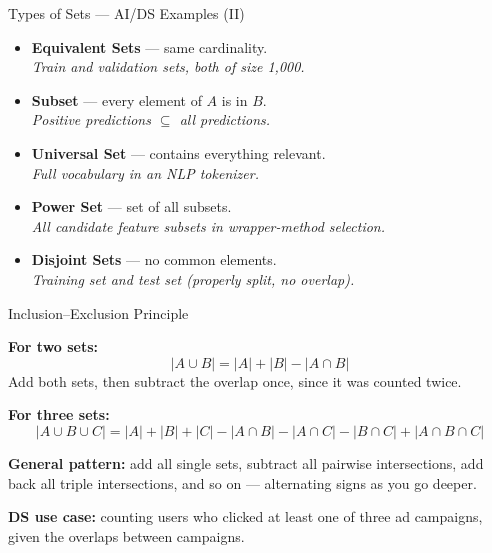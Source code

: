 \documentclass{beamer}
\begin{document}
\begin{frame}{Types of Sets --- AI/DS Examples (II)}

\begin{itemize}
    \item \textbf{Equivalent Sets} --- same cardinality. \\
    \textit{Train and validation sets, both of size 1{,}000.}
    \vspace{0.15cm}
    \item \textbf{Subset} --- every element of $A$ is in $B$. \\
    \textit{Positive predictions $\subseteq$ all predictions.}
    \vspace{0.15cm}
    \item \textbf{Universal Set} --- contains everything relevant. \\
    \textit{Full vocabulary in an NLP tokenizer.}
    \vspace{0.15cm}
    \item \textbf{Power Set} --- set of all subsets. \\
    \textit{All candidate feature subsets in wrapper-method selection.}
    \vspace{0.15cm}
    \item \textbf{Disjoint Sets} --- no common elements. \\
    \textit{Training set and test set (properly split, no overlap).}
\end{itemize}

\end{frame}

\begin{frame}{Inclusion--Exclusion Principle}

\textbf{For two sets:}
\[
|A \cup B| = |A| + |B| - |A \cap B|
\]
Add both sets, then subtract the overlap once, since it was counted twice.

\vspace{0.4cm}

\textbf{For three sets:}
\[
|A\cup B\cup C| = |A|+|B|+|C|-|A\cap B|-|A\cap C|-|B\cap C|+|A\cap B\cap C|
\]

\vspace{0.4cm}

\textbf{General pattern:} add all single sets, subtract all pairwise
intersections, add back all triple intersections, and so on ---
alternating signs as you go deeper.

\vspace{0.3cm}

\textbf{DS use case:} counting users who clicked at least one of three
ad campaigns, given the overlaps between campaigns.

\end{frame}
\end{document}
